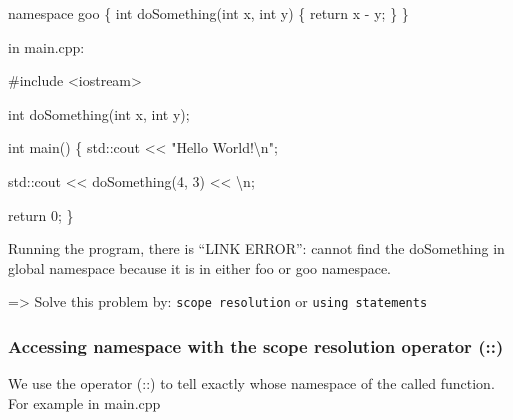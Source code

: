 \documentclass[
  letterpaper,
  DIV=11,
  numbers=noendperiod]{scrreprt}
\newenvironment{Shaded}{\begin{snugshade}}{\end{snugshade}}
\newcommand{\CommentTok}[1]{\textcolor[rgb]{0.37,0.37,0.37}{#1}}
\newcommand{\DecValTok}[1]{\textcolor[rgb]{0.68,0.00,0.00}{#1}}
\newcommand{\ErrorTok}[1]{\textcolor[rgb]{0.68,0.00,0.00}{#1}}
\newcommand{\FunctionTok}[1]{\textcolor[rgb]{0.28,0.35,0.67}{#1}}
\newcommand{\NormalTok}[1]{\textcolor[rgb]{0.00,0.23,0.31}{#1}}
\newcommand{\SpecialCharTok}[1]{\textcolor[rgb]{0.37,0.37,0.37}{#1}}
\newcommand{\StringTok}[1]{\textcolor[rgb]{0.13,0.47,0.30}{#1}}
\begin{document}
\begin{Shaded}
\begin{Highlighting}[]
\NormalTok{namespace goo}
\NormalTok{\{}
\NormalTok{    int }\FunctionTok{doSomething}\NormalTok{(int x, int y)}
\NormalTok{    \{}
\NormalTok{        return x }\SpecialCharTok{{-}}\NormalTok{ y;}
\NormalTok{    \}}
\NormalTok{\}}
\end{Highlighting}
\end{Shaded}

in main.cpp:

\begin{Shaded}
\begin{Highlighting}[]
\CommentTok{\#include \textless{}iostream\textgreater{}}

\NormalTok{int }\FunctionTok{doSomething}\NormalTok{(int x, int y);}

\NormalTok{int }\FunctionTok{main}\NormalTok{()}
\NormalTok{\{}
\NormalTok{    std}\SpecialCharTok{::}\NormalTok{cout }\SpecialCharTok{\textless{}}\ErrorTok{\textless{}} \StringTok{"Hello World!}\SpecialCharTok{\textbackslash{}n}\StringTok{"}\NormalTok{;}

\NormalTok{    std}\SpecialCharTok{::}\NormalTok{cout }\SpecialCharTok{\textless{}}\ErrorTok{\textless{}} \FunctionTok{doSomething}\NormalTok{(}\DecValTok{4}\NormalTok{, }\DecValTok{3}\NormalTok{) }\SpecialCharTok{\textless{}}\ErrorTok{\textless{}} \StringTok{\textquotesingle{}}\SpecialCharTok{\textbackslash{}n}\StringTok{\textquotesingle{}}\NormalTok{;}
    
\NormalTok{    return }\DecValTok{0}\NormalTok{;}
\NormalTok{\}}
\end{Highlighting}
\end{Shaded}

Running the program, there is ``LINK ERROR'': cannot find the
doSomething in global namespace because it is in either foo or goo
namespace.

=\textgreater{} Solve this problem by: \texttt{scope\ resolution} or
\texttt{using\ statements}

\hypertarget{accessing-namespace-with-the-scope-resolution-operator}{%
\subsubsection{Accessing namespace with the scope resolution operator
(::)}\label{accessing-namespace-with-the-scope-resolution-operator}}

We use the operator (::) to tell exactly whose namespace of the called
function. For example in main.cpp
\end{document}
